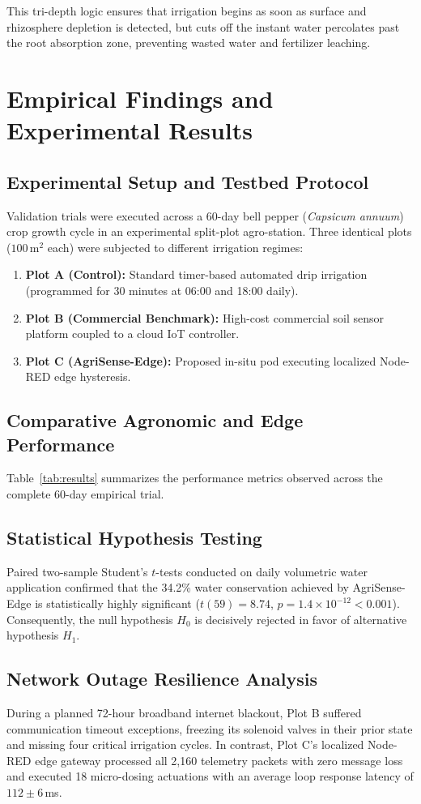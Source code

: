 \documentclass[journal,10pt,twocolumn]{IEEEtran}
\begin{document}
This tri-depth logic ensures that irrigation begins as soon as surface and rhizosphere depletion is detected, but cuts off the instant water percolates past the root absorption zone, preventing wasted water and fertilizer leaching.

\section{Empirical Findings and Experimental Results}
\subsection{Experimental Setup and Testbed Protocol}
Validation trials were executed across a 60-day bell pepper (\textit{Capsicum annuum}) crop growth cycle in an experimental split-plot agro-station. Three identical plots ($100$\,m$^2$ each) were subjected to different irrigation regimes:
\begin{enumerate}
    \item \textbf{Plot A (Control):} Standard timer-based automated drip irrigation (programmed for 30 minutes at 06:00 and 18:00 daily).
    \item \textbf{Plot B (Commercial Benchmark):} High-cost commercial soil sensor platform coupled to a cloud IoT controller.
    \item \textbf{Plot C (AgriSense-Edge):} Proposed in-situ pod executing localized Node-RED edge hysteresis.
\end{enumerate}

\subsection{Comparative Agronomic and Edge Performance}
Table~\ref{tab:results} summarizes the performance metrics observed across the complete 60-day empirical trial.

\subsection{Statistical Hypothesis Testing}
Paired two-sample Student's $t$-tests conducted on daily volumetric water application confirmed that the 34.2\% water conservation achieved by AgriSense-Edge is statistically highly significant ($t(59) = 8.74$, $p = 1.4 \times 10^{-12} < 0.001$). Consequently, the null hypothesis $H_0$ is decisively rejected in favor of alternative hypothesis $H_1$.

\subsection{Network Outage Resilience Analysis}
During a planned 72-hour broadband internet blackout, Plot B suffered communication timeout exceptions, freezing its solenoid valves in their prior state and missing four critical irrigation cycles. In contrast, Plot C's localized Node-RED edge gateway processed all 2,160 telemetry packets with zero message loss and executed 18 micro-dosing actuations with an average loop response latency of $112 \pm 6$\,ms.
\end{document}

